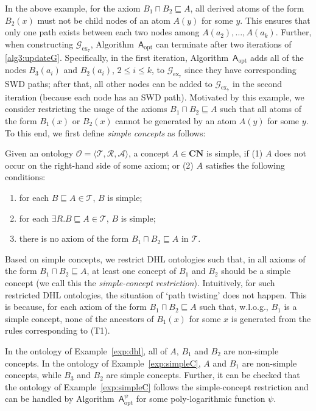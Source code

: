 In the above example, for the axiom $B_1\sqcap B_2\sqsubseteq A$, all derived atoms
of the form $B_2(x)$ must not be child nodes of an atom $A(y)$ for some $y$.
This ensures that only one path exists between each two nodes among $A(a_2),\ldots,A(a_k)$.
Further, when constructing $\mathcal{G}_{\text{ex}_7}$, Algorithm~$\mathsf{A}_{\text{opt}}$ can terminate after
two iterations of \ref{alg3:updateG}. Specifically, in the first iteration, Algorithm~$\mathsf{A}_{\text{opt}}$
adds all of the nodes $B_3(a_i)$ and $B_2(a_i)$, $2\leq i\leq k$, to $\mathcal{G}_{\text{ex}_7}$
since they have corresponding SWD paths;
after that, all other nodes
can be added to $\mathcal{G}_{\text{ex}_7}$ in the second iteration (because each
node has an SWD path).
Motivated by this example, we consider restricting the usage of
the axioms $B_1\sqcap B_2\sqsubseteq A$
such that all atoms of the form $B_1(x)$ or $B_2(x)$ cannot be generated by an atom $A(y)$
for some $y$.
To this end, we first define \emph{simple concepts} as follows:

\begin{definition}
Given an ontology $\mathcal{O}=\langle\mathcal{T},\mathcal{R},\mathcal{A}\rangle$,
a concept $A\in\textbf{CN}$ is simple, if (1) $A$ does not occur on the right-hand side
of some axiom; or (2) $A$ satisfies the following conditions:
\begin{enumerate}[leftmargin=4ex,label=\arabic*.]
\item for each $B\sqsubseteq A\in\mathcal{T}$, $B$ is simple;
\item for each $\exists R.B\sqsubseteq A\in\mathcal{T}$, $B$ is simple;
\item there is no axiom of the form $B_1\sqcap B_2\sqsubseteq A$ in $\mathcal{T}$.
\end{enumerate}
\end{definition}

Based on simple concepts, we restrict DHL ontologies such that, in all axioms of the
form $B_1\sqcap B_2\sqsubseteq A$, at least one concept of $B_1$ and $B_2$ should be a simple concept
(we call this the \emph{simple-concept restriction}).
Intuitively, for such restricted DHL ontologies, the situation of `path twisting' does not happen.
This is because, for each axiom of the form $B_1\sqcap B_2\sqsubseteq
A$ such that, w.l.o.g., $B_1$
is a simple concept, none of the ancestors of $B_1(x)$ for some $x$
is generated from the rules corresponding to (T1).

\begin{example}
In the ontology of Example~\ref{exp:dhl}, all of $A$, $B_1$ and $B_2$ are
non-simple concepts.
In the ontology of Example~\ref{exp:simpleC}, $A$ and $B_1$ are non-simple concepts,
while $B_3$ and $B_2$ are simple concepts. Further, it can be checked that
the ontology  of Example~\ref{exp:simpleC} follows the simple-concept restriction
and can be handled by Algorithm~$\mathsf{A}_{\text{opt}}^\psi$ for some poly-logarithmic function $\psi$.
\end{example}

